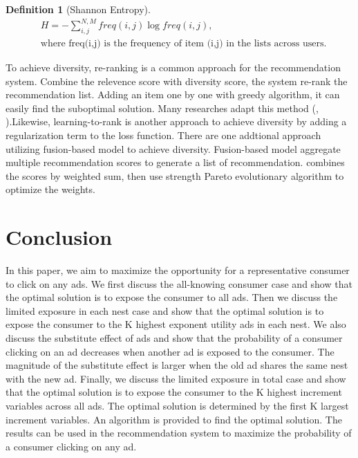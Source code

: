 \documentclass[12pt]{article}
\theoremstyle{definition}
\newtheorem{definition}{Definition}[section]
\begin{document}
\begin{sloppypar}
\begin{definition}[Shannon Entropy]
    \begin{align*}
        &H = -\sum_{i,j}^{N,M} freq(i,j) \log freq(i,j),\\
        &\text{where freq(i,j) is the frequency of item (i,j) in the lists across users.}
    \end{align*}
\end{definition}

To achieve diversity, re-ranking is a common approach for the recommendation system. Combine the relevence score with diversity score, the system re-rank the recommendation list. Adding an item one by one with greedy algorithm, it can easily find the suboptimal solution. Many researches adapt this method (\textcite{10.1145/1772690.1772780}, \textcite{10.1007/3-540-44593-5_25}).Likewise, learning-to-rank is another approach to achieve diversity by adding a regularization term to the loss function. There are one addtional approach utilizing fusion-based model to achieve diversity. Fusion-based model aggregate multiple recommendation scores to generate a list of recommendation. \textcite{10.1145/2365952.2365962} combines the scores by weighted sum, then use strength Pareto evolutionary algorithm to optimize the weights.

\section{Conclusion}
In this paper, we aim to maximize the opportunity for a representative consumer to click on any ads. We first discuss the all-knowing consumer case and show that the optimal solution is to expose the consumer to all ads. Then we discuss the limited exposure in each nest case and show that the optimal solution is to expose the consumer to the K highest exponent utility ads in each nest. We also discuss the substitute effect of ads and show that the probability of a consumer clicking on an ad decreases when another ad is exposed to the consumer. The magnitude of the substitute effect is larger when the old ad shares the same nest with the new ad. Finally, we discuss the limited exposure in total case and show that the optimal solution is to expose the consumer to the K highest increment variables across all ads. The optimal solution is determined by the first K largest increment variables. An algorithm is provided to find the optimal solution. The results can be used in the recommendation system to maximize the probability of a consumer clicking on any ad.


\end{sloppypar}
\end{document}
